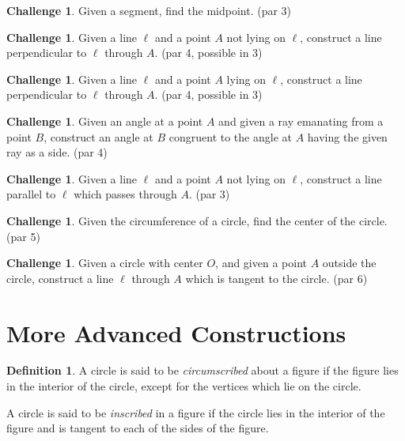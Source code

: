 \documentclass{tufte-handout}
\theoremstyle{definition}
\newtheorem*{definition}{Definition}
\newtheorem{challenge}[problem]{Challenge}
\begin{document}
\begin{challenge}\label{chal:midpoint}
Given a segment, find the midpoint. (par 3)
\end{challenge}

\begin{challenge}\label{chal:perp-pt-not-on-line}
Given a line $\ell$ and a point $A$ not lying on $\ell$, construct a line perpendicular to $\ell$ through $A$. (par 4, possible in 3)
\end{challenge}

\begin{challenge}\label{chal:perp-pt-on-line}
Given a line $\ell$ and a point $A$ lying on $\ell$, construct a line perpendicular to $\ell$ through $A$. (par 4, possible in 3)
\end{challenge}

\begin{challenge}\label{chal:copy-angle}
Given an angle at a point $A$ and given a ray emanating from a point $B$, construct an angle at $B$ congruent to the angle at $A$ having the given ray as a side. (par 4)
\end{challenge}

\begin{challenge}\label{chal:parallel}
Given a line $\ell$ and a point $A$ not lying on $\ell$, construct a line parallel to $\ell$ which passes through $A$. (par 3)
\end{challenge}

\begin{challenge}\label{chal:circle-center}
Given the circumference of a circle, find the center of the circle. (par 5)
\end{challenge}

\begin{challenge}\label{chal:tangent-circle-point}
Given a circle with center $O$, and given a point $A$ outside the circle, construct a line $\ell$ through $A$ which is tangent to the circle. (par 6)
\end{challenge}

\clearpage
\setcounter{section}{12}
\setcounter{problem}{0}
\section{More Advanced Constructions}

\begin{definition}\label{defn:circumscribed}
A circle is said to be \emph{circumscribed} about a figure if the figure lies in the interior of the circle, except for the vertices which lie on the circle.

A circle is said to be \emph{inscribed} in a figure if the circle lies in the interior of the figure and is tangent to each of the sides of the figure.
\end{definition}
\end{document}
